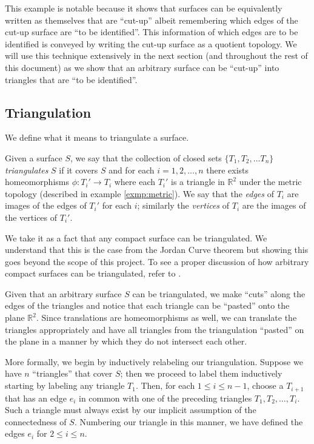 This example is notable because it shows that surfaces can be
equivalently written as themselves that are  ``cut-up'' albeit
remembering which edges of the cut-up surface are ``to be
identified''. This information of which edges are to be identified is
conveyed by writing the cut-up surface as a quotient topology. We will
use this technique extensively in the next section (and throughout the
rest of this document) as we show that an arbitrary surface can be
``cut-up'' into triangles that are ``to be identified''.

\subsection{Triangulation}
\label{sec:surf:triangulation}

We define what it means to triangulate a surface.

\begin{defn}
  Given a surface $S$, we say that the collection of closed sets $\{
  T_1,  T_2, \dots T_n \}$ \emph{triangulates} $S$ if it covers $S$
  and for each $i = 1,2, \dots, n$ there exists homeomorphisms $\phi
  : T_i' \rightarrow T_i$ where each $T_i'$ is a triangle in
  $\mathbb{R}^2$ under the metric topology (described in example
  \ref{exmp:metric}). We say that the \emph{edges} of $T_i$ are images
  of the edges of $T_i'$ for each $i$; similarly the \emph{vertices}
  of $T_i$ are the images of the vertices of $T_i'$.
\end{defn}

We take it as a fact that any compact surface can be triangulated. We
understand that this is the case from the Jordan Curve theorem but
showing this goes beyond the scope of this project. To see a proper
discussion of how arbitrary compact surfaces can be triangulated,
refer to \cite{thom}.

Given that an arbitrary surface $S$ can be triangulated, we make
``cuts'' along the edges of the triangles and notice that each
triangle can be ``pasted'' onto the plane $\mathbb{R}^2$. Since
translations are homeomorphisms as well, we can translate the
triangles appropriately and have all triangles from the triangulation
``pasted'' on the plane in a manner by which they do not intersect
each other.

More formally, we begin by inductively relabeling our
triangulation. Suppose we have $n$ ``triangles'' that cover $S$; then
we proceed to label them inductively starting by labeling any
triangle $T_1$. Then, for each $1 \leq i \leq n-1$, choose a $T_{i+1}$
that has an edge $e_i$ in common with one of the preceding
triangles $T_1, T_2, \dots, T_i$. Such a triangle must always exist by
our implicit assumption of the connectedness of $S$. Numbering  our
triangle in this manner, we have defined the edges $e_i$ for $2 \leq i
\leq n$. 

